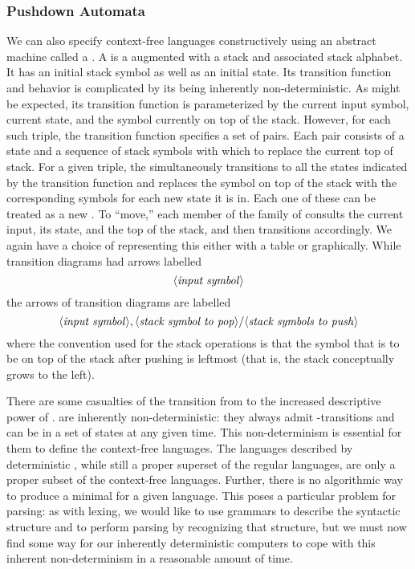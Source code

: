 \subsubsection{Pushdown Automata}
We can also specify context-free languages constructively using an abstract machine called a . A \PDA is a \FA augmented with a stack and associated stack alphabet. It has an initial stack symbol as well as an initial state. Its transition function and behavior is complicated by its being inherently non-deterministic. As might be expected, its transition function is parameterized by the current input symbol, current state, and the symbol currently on top of the stack. However, for each such triple, the transition function specifies a set of pairs. Each pair consists of a state and a sequence of stack symbols with which to replace the current top of stack. For a given triple, the \PDA simultaneously transitions to all the states indicated by the transition function and replaces the symbol on top of the stack with the corresponding symbols for each new state it is in. Each one of these can be treated as a new \PDA. To ``move,'' each member of the family of \PDAs consults the current input, its state, and the top of the stack, and then transitions accordingly. We again have a choice of representing this either with a table or graphically. While \FA transition diagrams had arrows labelled %
\[
\langle\text{\textit{input symbol}}\rangle
\]
the arrows of \PDA transition diagrams are labelled 
\[
\langle\text{\textit{input symbol}}\rangle, \langle\text{\textit{stack symbol to pop}}\rangle / \langle\text{\textit{stack symbols to push}}\rangle
\]
where the convention used for the stack operations is that the symbol that is to be on top of the stack after pushing is leftmost (that is, the stack conceptually grows to the left).

There are some casualties of the transition from \FAs to the increased descriptive power of \PDAs. \PDAs are inherently non-deterministic: they always admit \emptyword-transitions and can be in a set of states at any given time. This non-determinism is essential for them to define the context-free languages. The languages described by deterministic \PDAs, while still a proper superset of the regular languages, are only a proper subset of the context-free languages. Further, there is no algorithmic way to produce a minimal \PDA for a given language. This poses a particular problem for parsing: as with lexing, we would like to use grammars to describe the syntactic structure and \PDAs to perform parsing by recognizing that structure, but we must now find some way for our inherently deterministic computers to cope with this inherent non-determinism in a reasonable amount of time.

